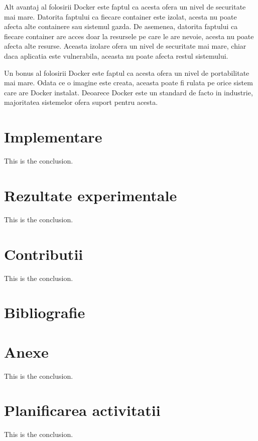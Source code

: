 \documentclass[titlepage,12pt]{article}
\begin{document}
Alt avantaj al folosirii Docker este faptul ca acesta ofera un nivel de securitate mai mare.
Datorita faptului ca fiecare container este izolat, acesta nu poate afecta alte containere sau sistemul gazda.
De asemenea, datorita faptului ca fiecare container are acces doar la resursele pe care le are nevoie, acesta nu poate afecta alte resurse.
Aceasta izolare ofera un nivel de securitate mai mare, chiar daca aplicatia este vulnerabila, aceasta nu poate afecta restul sistemului.

Un bonus al folosirii Docker este faptul ca acesta ofera un nivel de portabilitate mai mare. Odata ce o imagine este creata, aceasta poate fi rulata pe orice sistem care are Docker instalat.
Deoarece Docker este un standard de facto in industrie, majoritatea sistemelor ofera suport pentru acesta.

\section{Implementare}
This is the conclusion.

\section{Rezultate experimentale}
This is the conclusion.

\section{Contributii}
This is the conclusion.

\section{Bibliografie}
\printbibliography
\clearpage

\section{Anexe}
This is the conclusion.

\section{Planificarea activitatii}
This is the conclusion.
\end{document}
